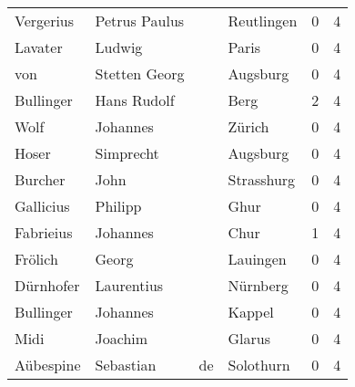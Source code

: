\begin{center}
\begin{tiny}
\begin{longtabu}{llllrr}
                Vergerius &                      Petrus Paulus &             &                                  Reutlingen &          0 &         4 \\
                  Lavater &                             Ludwig &             &                                       Paris &          0 &         4 \\
                      von &                      Stetten Georg &             &                                    Augsburg &          0 &         4 \\
                Bullinger &                        Hans Rudolf &             &                                        Berg &          2 &         4 \\
                     Wolf &                           Johannes &             &                                      Zürich &          0 &         4 \\
                    Hoser &                          Simprecht &             &                                    Augsburg &          0 &         4 \\
                  Burcher &                               John &             &                                  Strasshurg &          0 &         4 \\
                Gallicius &                            Philipp &             &                                        Ghur &          0 &         4 \\
                Fabrieius &                           Johannes &             &                                        Chur &          1 &         4 \\
                  Frölich &                              Georg &             &                                    Lauingen &          0 &         4 \\
                Dürnhofer &                         Laurentius &             &                                    Nürnberg &          0 &         4 \\
                Bullinger &                           Johannes &             &                                      Kappel &          0 &         4 \\
                     Midi &                            Joachim &             &                                      Glarus &          0 &         4 \\
                Aübespine &                          Sebastian &          de &                                   Solothurn &          0 &         4 \\

\end{longtabu}
\end{tiny}
\end{center}
